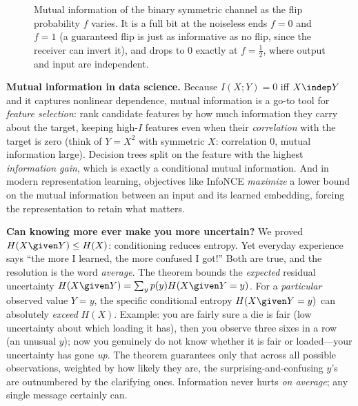 \begin{figure}[H]
\centering
{}
\caption{Mutual information of the binary symmetric channel as the flip probability $f$ varies. It is a
full bit at the noiseless ends $f=0$ and $f=1$ (a guaranteed flip is just as informative as no flip, since
the receiver can invert it), and drops to $0$ exactly at $f=\tfrac12$, where output and input are
independent.}
\label{ch33:fig-bsc-capacity}
\end{figure}

\begin{applicationbox}
\textbf{Mutual information in data science.} Because $I(X;Y) = 0$ iff $X \indep Y$ and it captures
nonlinear dependence, mutual information is a go-to tool for \emph{feature selection}: rank candidate
features by how much information they carry about the target, keeping high-$I$ features even when their
\emph{correlation} with the target is zero (think of $Y = X^2$ with symmetric $X$: correlation $0$, mutual
information large). Decision trees split on the feature with the highest \emph{information gain}, which is
exactly a conditional mutual information. And in modern representation learning, objectives like InfoNCE
\emph{maximize} a lower bound on the mutual information between an input and its learned embedding, forcing
the representation to retain what matters.
\end{applicationbox}

\begin{paradoxbox}
\textbf{Can knowing more ever make you more uncertain?} We proved $H(X\given Y) \le H(X)$: conditioning
reduces entropy. Yet everyday experience says ``the more I learned, the more confused I got!'' Both are
true, and the resolution is the word \emph{average}. The theorem bounds the \emph{expected} residual
uncertainty $H(X\given Y) = \sum_y p(y)H(X\given Y=y)$. For a \emph{particular} observed value $Y=y$, the
specific conditional entropy $H(X\given Y=y)$ can absolutely \emph{exceed} $H(X)$. Example: you are fairly
sure a die is fair (low uncertainty about which loading it has), then you observe three sixes in a row
(an unusual $y$); now you genuinely do not know whether it is fair or loaded---your uncertainty has gone
\emph{up}. The theorem guarantees only that across all possible observations, weighted by how likely they
are, the surprising-and-confusing $y$'s are outnumbered by the clarifying ones. Information never hurts
\emph{on average}; any single message certainly can.
\end{paradoxbox}

